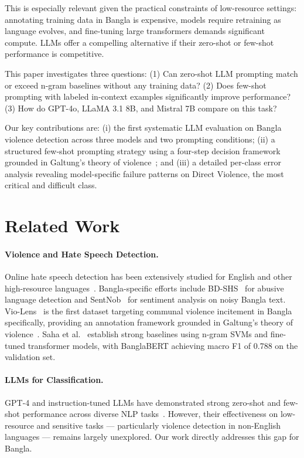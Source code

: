 \documentclass[sigconf,nonacm]{acmart}
\begin{document}
This is especially relevant given the practical constraints of low-resource settings: annotating training data in Bangla is expensive, models require retraining as language evolves, and fine-tuning large transformers demands significant compute. LLMs offer a compelling alternative if their zero-shot or few-shot performance is competitive.

This paper investigates three questions: (1) Can zero-shot LLM prompting match or exceed n-gram baselines without any training data? (2) Does few-shot prompting with labeled in-context examples significantly improve performance? (3) How do GPT-4o, LLaMA 3.1 8B, and Mistral 7B compare on this task?

Our key contributions are: (i) the first systematic LLM evaluation on Bangla violence detection across three models and two prompting conditions; (ii) a structured few-shot prompting strategy using a four-step decision framework grounded in Galtung's theory of violence~\cite{galtung}; and (iii) a detailed per-class error analysis revealing model-specific failure patterns on Direct Violence, the most critical and difficult class.

\section{Related Work}

\paragraph{Violence and Hate Speech Detection.}
Online hate speech detection has been extensively studied for English and other high-resource languages~\cite{nobata2016,silva2016}. Bangla-specific efforts include BD-SHS~\cite{bdshs} for abusive language detection and SentNob~\cite{sentnob} for sentiment analysis on noisy Bangla text. Vio-Lens~\cite{violens} is the first dataset targeting communal violence incitement in Bangla specifically, providing an annotation framework grounded in Galtung's theory of violence~\cite{galtung}. Saha et al.~\cite{violens} establish strong baselines using n-gram SVMs and fine-tuned transformer models, with BanglaBERT achieving macro F1 of 0.788 on the validation set.

\paragraph{LLMs for Classification.}
GPT-4 and instruction-tuned LLMs have demonstrated strong zero-shot and few-shot performance across diverse NLP tasks~\cite{brown2020,openai2023gpt4}. However, their effectiveness on low-resource and sensitive tasks — particularly violence detection in non-English languages — remains largely unexplored. Our work directly addresses this gap for Bangla.
\end{document}
